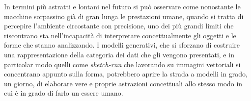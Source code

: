 In termini più astratti e lontani nel futuro si può osservare come nonostante le macchine sorpassino già di gran lunga le prestazioni umane, quando si tratta di percepire l'ambiente circostante con precisione, uno dei più grandi limiti che riscontrano sta nell'incapacità di interpretare concettualmente gli oggetti e le forme che stanno analizzando. I modelli generativi, che si sforzano di costruire una rappresentazione della categoria dei dati che gli vengono presentati, e in particolar modo quelli come \textit{sketch-rnn} che lavorando su immagini vettoriali si concentrano appunto sulla forma, potrebbero aprire la strada a modelli in grado, un giorno, di elaborare vere e proprie astrazioni concettuali allo stesso modo in cui è in grado di farlo un essere umano.
